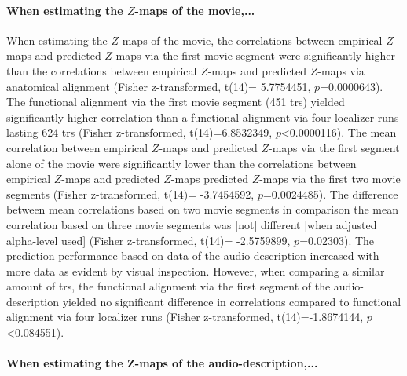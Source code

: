 \paragraph{When estimating the $Z$-maps of the movie,...}
%
When estimating the $Z$-maps of the movie, the correlations between empirical
$Z$-maps and predicted $Z$-maps via the first movie segment were significantly
higher than the correlations between empirical $Z$-maps and predicted $Z$-maps
via anatomical alignment (Fisher z-transformed, t(14)= 5.7754451,
$p$=0.0000643).
%
The functional alignment via the first movie segment (451 \acp{tr}) yielded
significantly higher correlation than a functional alignment via four localizer
runs lasting 624 \acp{tr} (Fisher z-transformed, t(14)=6.8532349,
$p$<0.0000116).
%
The mean correlation between empirical $Z$-maps and predicted $Z$-maps via the
first segment alone of the movie were significantly lower than the correlations
between empirical $Z$-maps and predicted $Z$-maps predicted $Z$-maps via the
first two movie segments (Fisher z-transformed, t(14)= -3.7454592,
$p$=0.0024485).
%
The difference between mean correlations based on two movie segments in
comparison the mean correlation based on three movie segments was [not]
different [when adjusted alpha-level used] (Fisher z-transformed, t(14)=
-2.5759899, $p$=0.02303).
%
The prediction performance based on data of the audio-description increased with
more data as evident by visual inspection.
%
However, when comparing a similar amount of \acp{tr}, the functional alignment
via the first segment of the audio-description yielded no significant difference
in correlations compared to functional alignment via four localizer runs (Fisher
z-transformed, t(14)=-1.8674144, $p$<0.084551).



\paragraph{When estimating the Z-maps of the audio-description,...}



